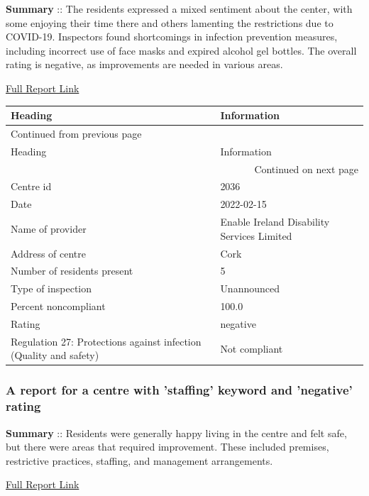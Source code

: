 \documentclass[a4paper,11pt,twoside]{article}
\begin{document}
\textbf{Summary} :: The residents expressed a mixed sentiment about the center, with some enjoying their time there and others lamenting the restrictions due to COVID-19. Inspectors found shortcomings in infection prevention measures, including incorrect use of face masks and expired alcohol gel bottles. The overall rating is negative, as improvements are needed in various areas.

\href{https://www.hiqa.ie/system/files?file=inspectionreports/2036-ard-na-mara-15-february-2022.pdf}{Full Report Link}


\begin{longtable}{p{11cm}|p{5cm}}
Heading & Information\\[0pt]
\hline
\endfirsthead
\multicolumn{2}{l}{Continued from previous page} \\[0pt]
\hline

Heading & Information \\[0pt]

\hline
\endhead
\hline\multicolumn{2}{r}{Continued on next page} \\
\endfoot
\endlastfoot
\hline
Centre id & 2036\\[0pt]
Date & 2022-02-15\\[0pt]
Name of provider & Enable Ireland Disability Services Limited\\[0pt]
Address of centre & Cork\\[0pt]
Number of residents present & 5\\[0pt]
Type of inspection & Unannounced\\[0pt]
Percent noncompliant & 100.0\\[0pt]
Rating & negative\\[0pt]
Regulation 27: Protections against infection (Quality and safety) & Not compliant\\[0pt]
\end{longtable}
\subsubsection{A report for a centre with 'staffing' keyword and 'negative' rating}
\label{sec:org01855bb}

\textbf{Summary} :: Residents were generally happy living in the centre and felt safe, but there were areas that required improvement. These included premises, restrictive practices, staffing, and management arrangements.

\href{https://www.hiqa.ie/system/files?file=inspectionreports/7820-tonyglassion-group-home-28-january-2021.pdf}{Full Report Link}
\end{document}
